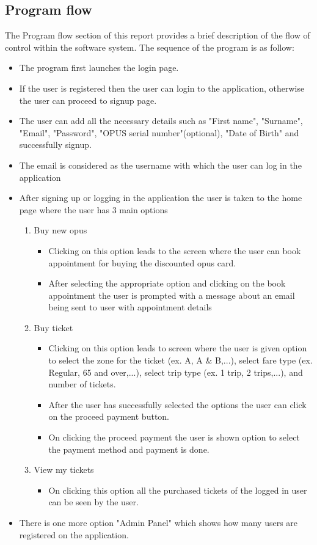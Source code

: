 \documentclass[a4paper,12pt]{article}
\begin{document}
\subsection{Program flow}
The Program flow section of this report provides a brief description of the flow of control within the software system. The sequence of the program is as follow:
\begin{itemize}[noitemsep]
    \item The program first launches the login page.
    \item If the user is registered then the user can login to the application, otherwise the user can proceed to signup page.
    \item The user can add all the necessary details such as "First name", "Surname", "Email", "Password", "OPUS serial number"(optional), "Date of Birth" and successfully signup.
    \item The email is considered as the username with which the user can log in the application
    \item After signing up or logging in the application the user is taken to the home page where the user has 3 main options
    \begin{enumerate}
        \item Buy new opus
        \begin{itemize}
            \item Clicking on this option leads to the screen where the user can book appointment for buying the discounted opus card.
            \item After selecting the appropriate option and clicking on the book appointment the user is prompted with a message about an email being sent to user with appointment details
        \end{itemize}
        \item Buy ticket
        \begin{itemize}
            \item Clicking on this option leads to screen where the user is given option to select the zone for the ticket (ex. A, A & B,...), select fare type (ex. Regular, 65 and over,...), select trip type (ex. 1 trip, 2 trips,...), and number of tickets.
            \item After the user has successfully selected the options the user can click on the proceed payment button.
            \item On clicking the proceed payment the user is shown option to select the payment method and payment is done.
        \end{itemize}
        \item View my tickets
        \begin{itemize}
            \item On clicking this option all the purchased tickets of the logged in user can be seen by the user.
        \end{itemize}
    \end{enumerate}
    \item There is one more option "Admin Panel" which shows how many users are registered on the application.
\end{itemize}
\end{document}
